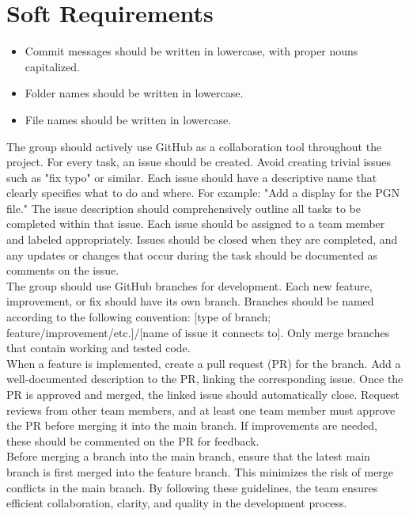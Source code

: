 \chapter{Soft Requirements}

\begin{itemize}
    \item Commit messages should be written in lowercase, with proper nouns capitalized.
    \item Folder names should be written in lowercase.
    \item File names should be written in lowercase.
\end{itemize}

The group should actively use GitHub as a collaboration tool throughout the project. For every task, an issue should be created. Avoid creating trivial issues such as "fix typo" or similar. Each issue should have a descriptive name that clearly specifies what to do and where. For example: "Add a display for the PGN file." The issue description should comprehensively outline all tasks to be completed within that issue. Each issue should be assigned to a team member and labeled appropriately. Issues should be closed when they are completed, and any updates or changes that occur during the task should be documented as comments on the issue. \\

The group should use GitHub branches for development. Each new feature, improvement, or fix should have its own branch. Branches should be named according to the following convention: [type of branch; feature/improvement/etc.]/[name of issue it connects to]. Only merge branches that contain working and tested code. \\

When a feature is implemented, create a pull request (PR) for the branch. Add a well-documented description to the PR, linking the corresponding issue. Once the PR is approved and merged, the linked issue should automatically close. Request reviews from other team members, and at least one team member must approve the PR before merging it into the main branch. If improvements are needed, these should be commented on the PR for feedback. \\

Before merging a branch into the main branch, ensure that the latest main branch is first merged into the feature branch. This minimizes the risk of merge conflicts in the main branch. By following these guidelines, the team ensures efficient collaboration, clarity, and quality in the development process. \\